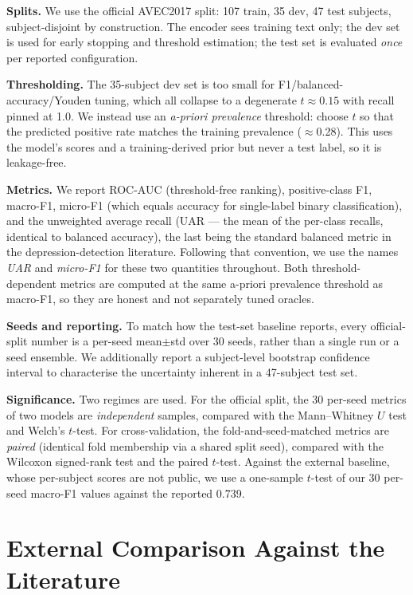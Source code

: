 \documentclass[conference]{IEEEtran}
\begin{document}
\textbf{Splits.} We use the official AVEC2017 split: 107 train, 35 dev, 47
test subjects, subject-disjoint by construction. The encoder
sees training text only; the dev set is used for early stopping and threshold
estimation; the test set is evaluated \emph{once} per reported configuration.

\textbf{Thresholding.} The 35-subject dev set is too small for F1/balanced-
accuracy/Youden tuning, which all collapse to a degenerate $t\!\approx\!0.15$
with recall pinned at 1.0. We instead use an \emph{a-priori prevalence}
threshold: choose $t$ so that the predicted positive rate matches the training
prevalence ($\approx$0.28). This uses the model's scores and a training-derived
prior but never a test label, so it is leakage-free.

\textbf{Metrics.} We report ROC-AUC (threshold-free ranking), positive-class
F1, macro-F1, micro-F1 (which equals accuracy for single-label binary
classification), and the unweighted average recall (UAR --- the mean of the
per-class recalls, identical to balanced accuracy), the last being the standard
balanced metric in the depression-detection literature. Following that
convention, we use the names \emph{UAR} and \emph{micro-F1} for these two
quantities throughout. Both threshold-dependent metrics are computed at the
same a-priori prevalence threshold as macro-F1, so they are honest and not
separately tuned oracles.

\textbf{Seeds and reporting.} To match how the test-set baseline reports, every
official-split number is a per-seed mean$\pm$std over 30 seeds, rather than a
single run or a seed ensemble. We additionally report a subject-level bootstrap
confidence interval to characterise the uncertainty inherent in a 47-subject
test set.

\textbf{Significance.} Two regimes are used. For the official split, the 30
per-seed metrics of two models are \emph{independent} samples, compared with
the Mann--Whitney $U$ test and Welch's $t$-test. For cross-validation, the
fold-and-seed-matched metrics are \emph{paired} (identical fold membership via
a shared split seed), compared with the Wilcoxon signed-rank test and the
paired $t$-test. Against the external baseline, whose per-subject scores are
not public, we use a one-sample $t$-test of our 30 per-seed macro-F1 values
against the reported 0.739.

\section{External Comparison Against the Literature}
\label{sec:external}
\end{document}
